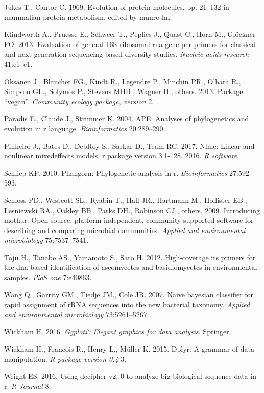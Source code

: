 \documentclass[11pt,]{article}
\begin{document}
\hypertarget{ref-jukes1969evolution}{}
Jukes T., Cantor C. 1969. Evolution of protein molecules, pp. 21--132 in
mammalian protein metabolism, edited by munro hn.

\hypertarget{ref-klindworth2013evaluation}{}
Klindworth A., Pruesse E., Schweer T., Peplies J., Quast C., Horn M.,
Glöckner FO. 2013. Evaluation of general 16S ribosomal rna gene pcr
primers for classical and next-generation sequencing-based diversity
studies. \emph{Nucleic acids research} 41:e1--e1.

\hypertarget{ref-oksanen2013package}{}
Oksanen J., Blanchet FG., Kindt R., Legendre P., Minchin PR., O'hara R.,
Simpson GL., Solymos P., Stevens MHH., Wagner H., others. 2013. Package
``vegan''. \emph{Community ecology package, version} 2.

\hypertarget{ref-paradis2004ape}{}
Paradis E., Claude J., Strimmer K. 2004. APE: Analyses of phylogenetics
and evolution in r language. \emph{Bioinformatics} 20:289--290.

\hypertarget{ref-pinheiro2017nlme}{}
Pinheiro J., Bates D., DebRoy S., Sarkar D., Team RC. 2017. Nlme: Linear
and nonlinear mixedeffects models. r package version 3.1-128. 2016.
\emph{R software}.

\hypertarget{ref-schliep2010phangorn}{}
Schliep KP. 2010. Phangorn: Phylogenetic analysis in r.
\emph{Bioinformatics} 27:592--593.

\hypertarget{ref-schloss2009introducing}{}
Schloss PD., Westcott SL., Ryabin T., Hall JR., Hartmann M., Hollister
EB., Lesniewski RA., Oakley BB., Parks DH., Robinson CJ., others. 2009.
Introducing mothur: Open-source, platform-independent,
community-supported software for describing and comparing microbial
communities. \emph{Applied and environmental microbiology}
75:7537--7541.

\hypertarget{ref-toju2012high}{}
Toju H., Tanabe AS., Yamamoto S., Sato H. 2012. High-coverage its
primers for the dna-based identification of ascomycetes and
basidiomycetes in environmental samples. \emph{PloS one} 7:e40863.

\hypertarget{ref-wang2007naive}{}
Wang Q., Garrity GM., Tiedje JM., Cole JR. 2007. Naive bayesian
classifier for rapid assignment of rRNA sequences into the new bacterial
taxonomy. \emph{Applied and environmental microbiology} 73:5261--5267.

\hypertarget{ref-wickham2016ggplot2}{}
Wickham H. 2016. \emph{Ggplot2: Elegant graphics for data analysis}.
Springer.

\hypertarget{ref-wickham2015dplyr}{}
Wickham H., Francois R., Henry L., Müller K. 2015. Dplyr: A grammar of
data manipulation. \emph{R package version 0.4} 3.

\hypertarget{ref-wright2016using}{}
Wright ES. 2016. Using decipher v2. 0 to analyze big biological sequence
data in r. \emph{R Journal} 8.




\newpage
\singlespacing 
\end{document}
